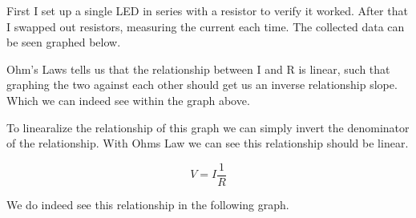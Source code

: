 \documentclass[prb,preprint]{revtex4-1}
\begin{document}
First I set up a single LED in series with a resistor to verify it worked. After that I swapped out resistors, measuring the current each time. The collected data can be seen graphed below.



Ohm's Laws tells us that the relationship between I and R is linear, such that graphing the two against each other should get us an inverse relationship slope. Which we can indeed see within the graph above.

To linearalize the relationship of this graph we can simply invert the denominator of the relationship. With Ohms Law we can see this relationship should be linear. 

\begin{equation}
V=I\frac{1}{R}
\end{equation}

We do indeed see this relationship in the following graph.
\end{document}
